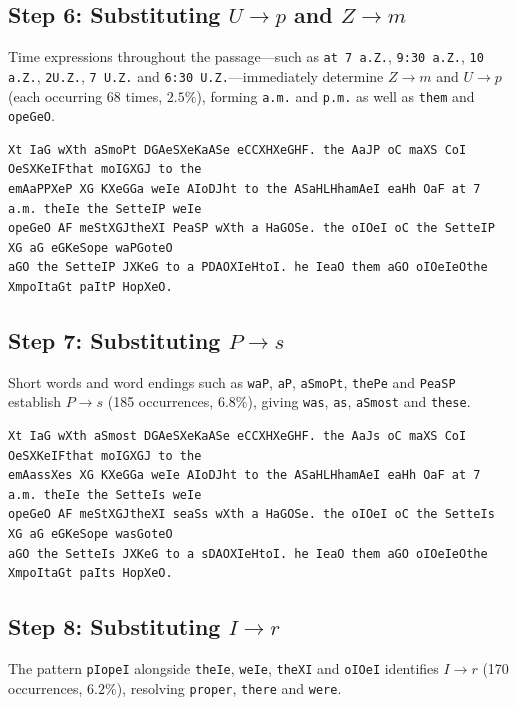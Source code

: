 \documentclass{utmreport}
\begin{document}
\subsection{Step 6: Substituting $U\rightarrow p$ and $Z\rightarrow m$}
Time expressions throughout the passage—such as \texttt{at 7 a.Z.}, \texttt{9:30 a.Z.}, \texttt{10 a.Z.}, \texttt{2U.Z.}, \texttt{7 U.Z.} and \texttt{6:30 U.Z.}—immediately determine $Z\rightarrow m$ and $U\rightarrow p$ (each occurring 68 times, $2.5\%$), forming \texttt{a.m.} and \texttt{p.m.} as well as \texttt{them} and \texttt{opeGeO}.
\begin{lstlisting}
Xt IaG wXth aSmoPt DGAeSXeKaASe eCCXHXeGHF. the AaJP oC maXS CoI OeSXKeIFthat moIGXGJ to the
emAaPPXeP XG KXeGGa weIe AIoDJht to the ASaHLHhamAeI eaHh OaF at 7 a.m. theIe the SetteIP weIe
opeGeO AF meStXGJtheXI PeaSP wXth a HaGOSe. the oIOeI oC the SetteIP XG aG eGKeSope waPGoteO
aGO the SetteIP JXKeG to a PDAOXIeHtoI. he IeaO them aGO oIOeIeOthe XmpoItaGt paItP HopXeO.
\end{lstlisting}

\subsection{Step 7: Substituting $P\rightarrow s$}
Short words and word endings such as \texttt{waP}, \texttt{aP}, \texttt{aSmoPt}, \texttt{thePe} and \texttt{PeaSP} establish $P\rightarrow s$ (185 occurrences, $6.8\%$), giving \texttt{was}, \texttt{as}, \texttt{aSmost} and \texttt{these}.
\begin{lstlisting}
Xt IaG wXth aSmost DGAeSXeKaASe eCCXHXeGHF. the AaJs oC maXS CoI OeSXKeIFthat moIGXGJ to the
emAassXes XG KXeGGa weIe AIoDJht to the ASaHLHhamAeI eaHh OaF at 7 a.m. theIe the SetteIs weIe
opeGeO AF meStXGJtheXI seaSs wXth a HaGOSe. the oIOeI oC the SetteIs XG aG eGKeSope wasGoteO
aGO the SetteIs JXKeG to a sDAOXIeHtoI. he IeaO them aGO oIOeIeOthe XmpoItaGt paIts HopXeO.
\end{lstlisting}

\subsection{Step 8: Substituting $I\rightarrow r$}
The pattern \texttt{pIopeI} alongside \texttt{theIe}, \texttt{weIe}, \texttt{theXI} and \texttt{oIOeI} identifies $I\rightarrow r$ (170 occurrences, $6.2\%$), resolving \texttt{proper}, \texttt{there} and \texttt{were}.

\clearpage
\end{document}
